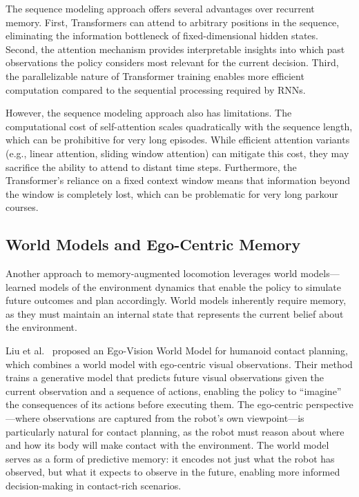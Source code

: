 The sequence modeling approach offers several advantages over recurrent memory. First, Transformers can attend to arbitrary positions in the sequence, eliminating the information bottleneck of fixed-dimensional hidden states. Second, the attention mechanism provides interpretable insights into which past observations the policy considers most relevant for the current decision. Third, the parallelizable nature of Transformer training enables more efficient computation compared to the sequential processing required by RNNs.

However, the sequence modeling approach also has limitations. The computational cost of self-attention scales quadratically with the sequence length, which can be prohibitive for very long episodes. While efficient attention variants (e.g., linear attention, sliding window attention) can mitigate this cost, they may sacrifice the ability to attend to distant time steps. Furthermore, the Transformer's reliance on a fixed context window means that information beyond the window is completely lost, which can be problematic for very long parkour courses.

\subsection{World Models and Ego-Centric Memory}

Another approach to memory-augmented locomotion leverages world models---learned models of the environment dynamics that enable the policy to simulate future outcomes and plan accordingly. World models inherently require memory, as they must maintain an internal state that represents the current belief about the environment.

Liu et al.~\cite{liu2024egovision1,liu2024egovision2} proposed an Ego-Vision World Model for humanoid contact planning, which combines a world model with ego-centric visual observations. Their method trains a generative model that predicts future visual observations given the current observation and a sequence of actions, enabling the policy to ``imagine'' the consequences of its actions before executing them. The ego-centric perspective---where observations are captured from the robot's own viewpoint---is particularly natural for contact planning, as the robot must reason about where and how its body will make contact with the environment. The world model serves as a form of predictive memory: it encodes not just what the robot has observed, but what it expects to observe in the future, enabling more informed decision-making in contact-rich scenarios.

